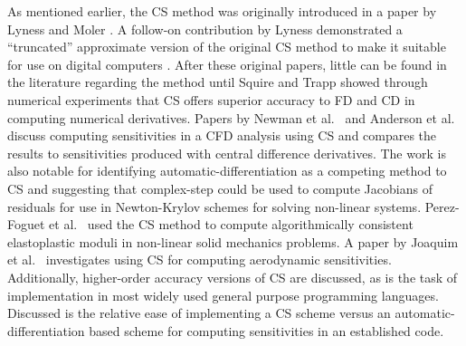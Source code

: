 \documentclass[preprint,12pt]{elsarticle}
\begin{document}
As mentioned earlier, the CS method was originally introduced in a paper by Lyness and Moler \cite{lyness1967numerical}.  A follow-on contribution by Lyness demonstrated a ``truncated'' approximate version of the original CS method to make it suitable for use on digital computers \cite{lyness1968differentiation}.  After these original papers, little can be found in the literature regarding the method until Squire and Trapp showed through numerical experiments that CS offers superior accuracy to FD and CD \cite{squire1998using} in computing numerical derivatives. Papers by Newman et al.\ \cite{newman1998} and Anderson et al.\ \cite{anderson2001sensitivity} discuss computing sensitivities in a CFD analysis using CS and compares the results to sensitivities produced with central difference derivatives. The work is also notable for identifying automatic-differentiation as a competing method to CS and suggesting that complex-step could be used to compute Jacobians of residuals for use in Newton-Krylov schemes for solving non-linear systems. Perez-Foguet et al.\ \cite{perez2000numerical, perez2012numerical} used the CS method to compute algorithmically consistent elastoplastic moduli in non-linear solid mechanics problems.  A paper by Joaquim et al.\ \cite{martins2000automated} investigates using CS for computing aerodynamic sensitivities. Additionally, higher-order accuracy versions of CS are discussed, as is the task of implementation in most widely used general purpose programming languages. Discussed is the relative ease of implementing a CS scheme versus an automatic-differentiation based scheme for computing sensitivities in an established code.  
\end{document}
